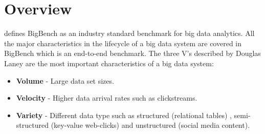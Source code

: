 \documentclass[12pt]{book}
\begin{document}
\section{Overview}
 \cite{ghazal} defines BigBench as an industry standard benchmark for big data analytics. All the major characteristics in the lifecycle of a 
 big data system are covered in BigBench which is an end-to-end benchmark. The three V's described by Douglas Laney \cite{doug} are the most 
 important characteristics of a big data system:
\begin{itemize}
 \item \textbf{Volume} - Large data set sizes.
 \item \textbf{Velocity} - Higher data arrival rates such as clickstreams.
 \item \textbf{Variety} - Different data type such as structured (relational tables) , semi-structured (key-value web-clicks) 
  and unstructured (social media content).
\end{itemize}
\end{document}
